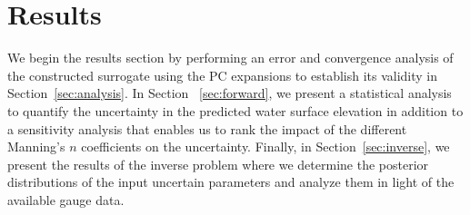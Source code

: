 \section{Results}
\label{sec:results}
We begin the results section by performing an error and convergence 
analysis of the constructed surrogate using the PC expansions to 
establish its validity in Section~\ref{sec:analysis}.  In Section
~\ref{sec:forward}, we present a statistical analysis to quantify the 
uncertainty in the predicted water surface elevation in addition to a 
sensitivity analysis that enables us to rank the impact of the 
different Manning's $n$ coefficients on the uncertainty. Finally, 
in Section~\ref{sec:inverse}, we present the results of the inverse problem 
where we determine the posterior distributions of the input uncertain
parameters and analyze them in light of the available gauge data.



